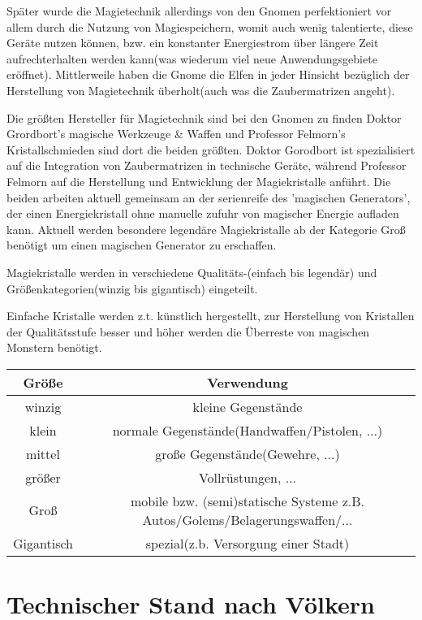 Später wurde die Magietechnik allerdings von den Gnomen perfektioniert vor allem durch die Nutzung von Magiespeichern, womit auch wenig talentierte, diese Geräte nutzen können, bzw. ein konstanter Energiestrom über längere Zeit aufrechterhalten werden kann(was wiederum viel neue Anwendungsgebiete eröffnet). Mittlerweile haben die Gnome die Elfen in jeder Hinsicht bezüglich der Herstellung von Magietechnik überholt(auch was die Zaubermatrizen angeht).

Die größten Hersteller für Magietechnik sind bei den Gnomen zu finden Doktor Grordbort's magische Werkzeuge \& Waffen und Professor Felmorn's Kristallschmieden sind dort die beiden größten.
Doktor Gorodbort ist spezialisiert auf die Integration von Zaubermatrizen in technische Geräte, während Professor Felmorn auf die Herstellung und Entwicklung der Magiekristalle anführt.
Die beiden arbeiten aktuell gemeinsam an der serienreife des 'magischen Generators', der einen Energiekristall ohne manuelle zufuhr von magischer Energie aufladen kann. Aktuell werden besondere legendäre Magiekristalle ab der Kategorie Groß benötigt um einen magischen Generator zu erschaffen.

Magiekristalle werden in verschiedene Qualitäts-(einfach bis legendär) und Größenkategorien(winzig bis gigantisch) eingeteilt.

Einfache Kristalle werden z.t. künstlich hergestellt, zur Herstellung von Kristallen der Qualitätsstufe besser und höher werden die Überreste von magischen Monstern benötigt.

\begin{tabular}{|c|c|}
\hline
Größe & Verwendung\\
\hline
\hline
winzig & kleine Gegenstände\\
\hline
klein & normale Gegenstände(Handwaffen/Pistolen, ...)\\
\hline
mittel & große Gegenstände(Gewehre, ...)\\
\hline
größer & Vollrüstungen, ...\\
\hline
Groß & mobile bzw. (semi)statische Systeme z.B. Autos/Golems/Belagerungswaffen/...\\
\hline
Gigantisch & spezial(z.b. Versorgung einer Stadt)\\
\hline
\end{tabular}

\section{Technischer Stand nach Völkern}

